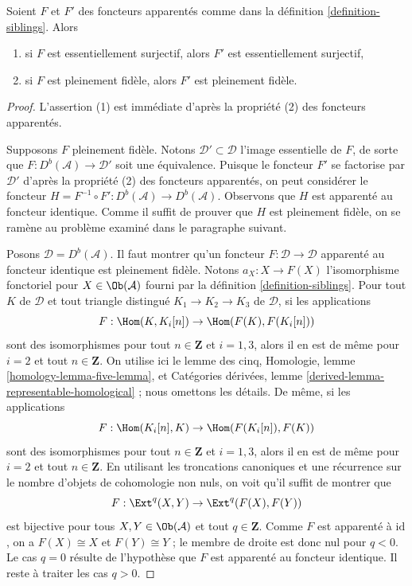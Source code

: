 \begin{lemma}
\label{lemma-sibling-faithful}
Soient $F$ et $F'$ des foncteurs apparentés comme dans la définition \ref{definition-siblings}.
Alors
\begin{enumerate}
\item si $F$ est essentiellement surjectif, alors $F'$ est essentiellement
surjectif,
\item si $F$ est pleinement fidèle, alors $F'$ est pleinement fidèle.
\end{enumerate}
\end{lemma}

\begin{proof}
L'assertion (1) est immédiate d'après la propriété (2) des foncteurs apparentés.

\medskip\noindent
Supposons $F$ pleinement fidèle. Notons $\mathcal{D}' \subset \mathcal{D}$
l'image essentielle de $F$, de sorte que $F : D^b(\mathcal{A}) \to \mathcal{D}'$
soit une équivalence. Puisque le foncteur $F'$ se factorise par $\mathcal{D}'$
d'après la propriété (2) des foncteurs apparentés, on peut considérer le foncteur
$H = F^{-1} \circ F' : D^b(\mathcal{A}) \to D^b(\mathcal{A})$.
Observons que $H$ est apparenté au foncteur identique.
Comme il suffit de prouver que $H$ est pleinement fidèle,
on se ramène au problème examiné dans le paragraphe suivant.

\medskip\noindent
Posons $\mathcal{D} = D^b(\mathcal{A})$. Il faut montrer qu'un foncteur
$F : \mathcal{D} \to \mathcal{D}$ apparenté au foncteur identique est pleinement fidèle.
Notons $a_X : X \to F(X)$ l'isomorphisme fonctoriel pour
$X \in \Ob(\mathcal{A})$ fourni par la définition \ref{definition-siblings}.
Pour tout $K$ de $\mathcal{D}$ et tout triangle distingué
$K_1 \to K_2 \to K_3$ de $\mathcal{D}$,
si les applications
$$
F : \Hom(K, K_i[n]) \to \Hom(F(K), F(K_i[n]))
$$
sont des isomorphismes pour tout $n \in \mathbf{Z}$ et $i = 1, 3$, alors il en
est de même pour $i = 2$ et tout $n \in \mathbf{Z}$. On utilise ici
le lemme des cinq, Homologie, lemme \ref{homology-lemma-five-lemma}, et
Catégories dérivées, lemme \ref{derived-lemma-representable-homological} ;
nous omettons les détails. De même, si les applications
$$
F : \Hom(K_i[n], K) \to \Hom(F(K_i[n]), F(K))
$$
sont des isomorphismes pour tout $n \in \mathbf{Z}$ et $i = 1, 3$, alors il en
est de même pour $i = 2$ et tout $n \in \mathbf{Z}$. En utilisant les troncations
canoniques et une récurrence sur le nombre d'objets de cohomologie non nuls,
on voit qu'il suffit de montrer que
$$
F : \Ext^q(X, Y) \to \Ext^q(F(X), F(Y))
$$
est bijective pour tous $X, Y \in \Ob(\mathcal{A})$ et tout $q \in \mathbf{Z}$.
Comme $F$ est apparenté à $\text{id}$, on a $F(X) \cong X$ et
$F(Y) \cong Y$ ; le membre de droite est donc nul pour $q < 0$.
Le cas $q = 0$ résulte de l'hypothèse que $F$ est apparenté au
foncteur identique. Il reste à traiter les cas $q > 0$.


\end{proof}

